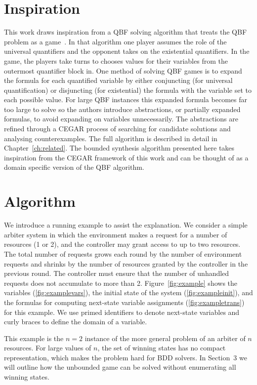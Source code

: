 \section{Inspiration}

This work draws inspiration from a QBF solving algorithm that treats the QBF problem as a game~\cite{Janota12}. In that algorithm one player assumes the role of the universal quantifiers and the opponent takes on the existential quantifiers. In the game, the players take turns to chooses values for their variables from the outermost quantifier block in. One method of solving QBF games is to expand the formula for each quantified variable by either conjuncting (for universal quantification) or disjuncting (for existential) the formula with the variable set to each possible value. For large QBF instances this expanded formula becomes far too large to solve so the authors introduce abstractions, or partially expanded formulas, to avoid expanding on variables unnecessarily. The abstractions are refined through a CEGAR process of searching for candidate solutions and analysing counterexamples. The full algorithm is described in detail in Chapter~\ref{ch:related}. The bounded synthesis algorithm presented here takes inspiration from the CEGAR framework of this work and can be thought of as a domain specific version of the QBF algorithm.

\section{Algorithm}

\begin{exmp}

We introduce a running example to assist the explanation. We consider a simple
arbiter system in which the environment makes a request for a number of
resources (1 or 2), and the controller may grant access to up to two resources.
The total number of requests grows each round by the number of environment
requests and shrinks by the number of resources granted by the controller in
the previous round.  The controller must ensure that the number of unhandled
requests does not accumulate to more than 2.  Figure~\ref{fig:example} shows
the variables (\ref{fig:examplevars}), the initial state of the system (\ref{fig:exampleinit}), 
and the formulas for computing next-state
variable assignments (\ref{fig:exampletrans}) for this example. We use primed identifiers
to denote next-state variables and curly braces to define the domain of a
variable.

This example is the $n=2$ instance of the more general problem of an arbiter of
$n$ resources. For large values of $n$, the set of winning states has no compact representation, which
makes the problem hard for BDD solvers. In Section~3 we will outline how the
unbounded game can be solved without enumerating all winning states.

\end{exmp}


